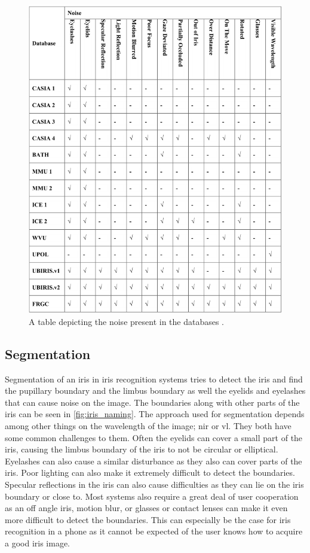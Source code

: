 \begin{figure}[H]
\centering
\includegraphics[width=\textwidth]{figures/Iris_Database_tabel_2.png} 
\caption{A table depicting the noise present in the databases  \citep{Rifaee2017}.}
\label{fig:Iris_database_2}
\end{figure}


\subsection{Segmentation}
Segmentation of an iris in iris recognition systems tries to detect the iris and find the pupillary boundary and the limbus boundary as well the eyelids and eyelashes that can cause noise on the image. The boundaries along with other parts of the iris can be seen in \autoref{fig:iris_naming}. The approach used for segmentation depends among other things on the wavelength of the image; \gls{nir} or \gls{vl}. They both have some common challenges to them. Often the eyelids can cover a small part of the iris, causing the limbus boundary of the iris to not be circular or elliptical. Eyelashes can also cause a similar disturbance as they also can cover parts of the iris. Poor lighting can also make it extremely difficult to detect the boundaries. Specular reflections in the iris can also cause difficulties as they can lie on the iris boundary or close to. Most systems also require a great deal of user cooperation as an off angle iris, motion blur, or glasses or contact lenses can make it even more difficult to detect the boundaries. This can especially be the case for iris recognition in a phone as it cannot be expected of the user knows how to acquire a good iris image. 

